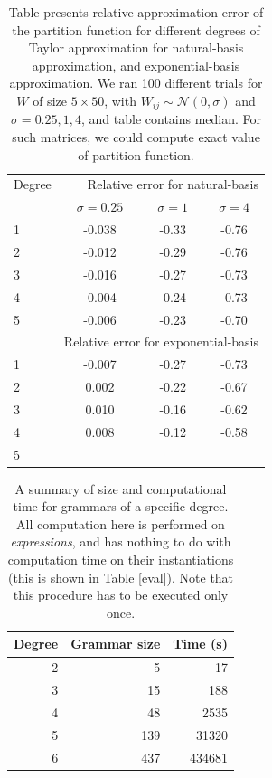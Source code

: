 \begin{table}[t]
\tiny
\centering
\begin{tabular}{lccc}
\hline
Degree & \multicolumn{3}{r}{Relative error for natural-basis} \\
       & $\sigma = 0.25$ & $\sigma = 1$ & $\sigma = 4$  \\
\hline
1      &-0.038                 &-0.33              &-0.76 \\
2      &-0.012                 &-0.29              &-0.76 \\
3      &-0.016                 &-0.27              &-0.73 \\
4      &-0.004                 &-0.24              &-0.73 \\
5      &-0.006                 &-0.23              &-0.70 \\
\hline
       & \multicolumn{3}{r}{Relative error for exponential-basis} \\
\hline
1      &-0.007                 &-0.27              &-0.73 \\
2      & 0.002                 &-0.22              &-0.67 \\
3      & 0.010                 &-0.16              &-0.62 \\
4      & 0.008                 &-0.12              &-0.58 \\
5      &                       &                   & \\
\hline
\end{tabular}
\caption{Table presents relative approximation error of the partition function for different
degrees of Taylor approximation for natural-basis approximation, and exponential-basis
approximation. We ran 100
different trials for $W$ of size $5 \times 50$, with $W_{ij} \sim
\mathcal{N}(0, \sigma)$ and $\sigma=0.25, 1, 4$, and table contains median.
For such matrices, we could compute exact value of partition function.}
\label{error_approx}
\end{table}



\begin{table}[t]
\tiny
\centering
\begin{tabular}{rrr}
\hline
Degree & Grammar size & Time (s) \\
\hline
2 & 5 & 17 \\
3 & 15 & 188 \\
4 & 48 & 2535\\
5 & 139 & 31320 \\
6 & 437 & 434681 \\
\hline
\end{tabular}
\caption{A summary of size and computational time for grammars of a specific degree. 
  All computation here is performed on {\em expressions}, and has
  nothing to do with computation time on their instantiations (this is
  shown in Table \ref{eval}). Note that this procedure has to be executed only once.}
\label{grammars}
\vspace{-4mm}
\end{table}


